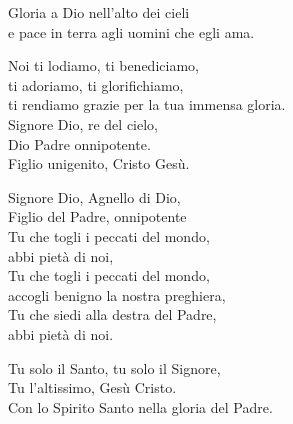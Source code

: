 \documentclass[11pt]{book}
\begin{document}
\vspace{-0.5\baselineskip}
\settowidth{\versewidth}{ti rendiamo grazie per la tua immensa gloria.}
\begin{canzone}%
\begin{ritornello}
Gloria a Dio nell'alto dei cieli\\
e pace in terra agli uomini che egli ama.
\end{ritornello}

Noi ti lodiamo, ti benediciamo,\\
ti adoriamo, ti glorifichiamo,\\
ti rendiamo grazie per la tua immensa gloria.\\
Signore Dio, re del cielo,\\
Dio Padre onnipotente.\\
Figlio unigenito, Cristo Gesù.

Signore Dio, Agnello di Dio,\\
Figlio del Padre, onnipotente\\
Tu che togli i peccati del mondo,\\
abbi pietà di noi,\\
Tu che togli i peccati del mondo,\\
accogli benigno la nostra preghiera,\\
Tu che siedi alla destra del Padre,\\
abbi pietà di noi.

Tu solo il Santo, tu solo il Signore,\\
Tu l'altissimo, Gesù Cristo.\\
Con lo Spirito Santo nella gloria del Padre.
\end{canzone}
\end{document}
